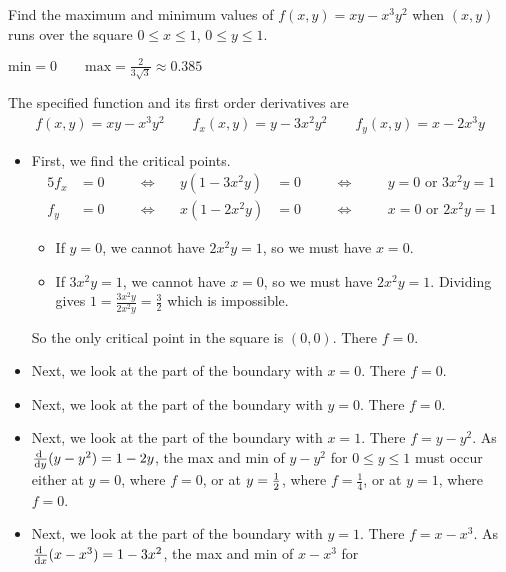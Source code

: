 \begin{question}
Find the maximum and minimum values of $f(x,y)=xy-x^3y^2$ when $(x,y)$
runs over the square $0\le x\le 1$, $0\le y\le 1$.
\end{question}

%

\begin{answer}
$\text{min}=0\qquad
\text{max}=\frac{2}{3\sqrt{3}}\approx0.385$
\end{answer}

\begin{solution}
The specified function and its first order derivatives are
\begin{align*}
f(x,y)=xy-x^3y^2\qquad
f_x(x,y)=y-3x^2y^2\qquad
f_y(x,y)=x-2x^3y
\end{align*}
\begin{itemize}
\item
First, we find the critical points.
\begin{alignat*}{5}
f_x&=0 & &\quad\iff\quad  &y(1-3x^2y)&=0 & 
         &\quad\iff\quad & &y=0 \text{ or } 3x^2y=1 \\
f_y&=0 & &\quad\iff\quad  &x(1-2x^2y)&=0 & 
         &\quad\iff\quad & &x=0 \text{ or } 2x^2y=1 
\end{alignat*}
\begin{itemize}
\item
If $y=0$, we cannot have $2x^2y=1$, so we must have $x=0$.
\item
If $3x^2y=1$, we cannot have $x=0$, so we must have $2x^2y=1$. Dividing
gives $1=\frac{3x^2y}{2x^2y}=\frac{3}{2}$ which is impossible.
\end{itemize}
So the only critical point in the square is $(0,0)$. There $f=0$.
\item
Next, we look at the part of the boundary with $x=0$. There $f=0$.
\item
Next, we look at the part of the boundary with $y=0$. There $f=0$.
\item
Next, we look at the part of the boundary with $x=1$. There $f=y-y^2$.
As $\diff{}{y}(y-y^2)=1-2y$, the max and min of $y-y^2$ for 
$0\le y\le 1$ must occur either at $y=0$, where $f=0$, or at $y=\tfrac{1}{2}$, 
where $f=\frac{1}{4}$, or at $y=1$, where $f=0$.
\item
Next, we look at the part of the boundary with $y=1$. There $f=x-x^3$.
As $\diff{}{x}(x-x^3)=1-3x^2$, the max and min of $x-x^3$ for 

\end{itemize}
\end{solution}
